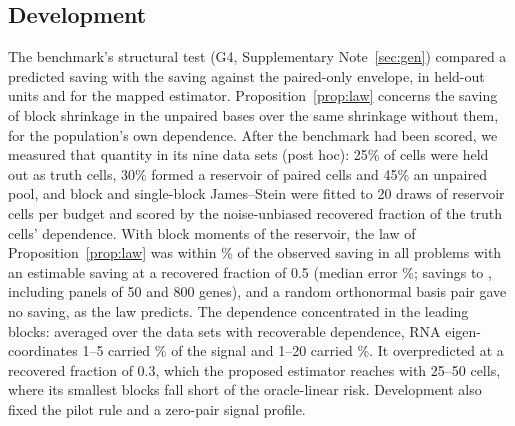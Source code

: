 \subsection*{Development}
The benchmark's structural test (G4, Supplementary Note~\ref{sec:gen}) compared a predicted saving with the saving against the paired-only envelope, in held-out units and for the mapped estimator. Proposition~\ref{prop:law} concerns the saving of block shrinkage in the unpaired bases over the same shrinkage without them, for the population's own dependence. After the benchmark had been scored, we measured that quantity in its nine data sets (post hoc): 25\% of cells were held out as truth cells, 30\% formed a reservoir of paired cells and 45\% an unpaired pool, and block and single-block James--Stein were fitted to 20 draws of reservoir cells per budget and scored by the noise-unbiased recovered fraction of the truth cells' dependence. With block moments of the reservoir, the law of Proposition~\ref{prop:law} was within \PredDevLawErrMax\% of the observed saving in all \PredDevN{} problems with an estimable saving at a recovered fraction of 0.5 (median error \PredDevLawErr\%; savings \PredDevSaveMin{} to \PredDevSaveMax, including panels of 50 and 800 genes), and a random orthonormal basis pair gave no saving, as the law predicts. The dependence concentrated in the leading blocks: averaged over the \PredProfileN{} data sets with recoverable dependence, RNA eigen-coordinates 1--5 carried \PredProfileTop\% of the signal and 1--20 carried \PredProfileTopTwenty\%. It overpredicted at a recovered fraction of 0.3, which the proposed estimator reaches with 25--50 cells, where its smallest blocks fall short of the oracle-linear risk. Development also fixed the pilot rule and a zero-pair signal profile.

